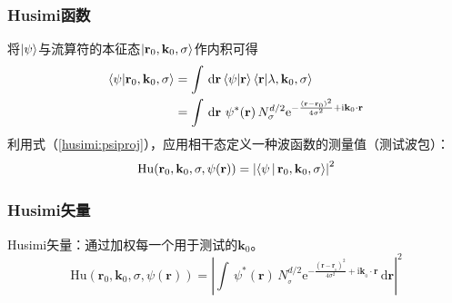 \documentclass[UTF8]{beamer}
\begin{document}
\begin{frame}
    \frametitle{Husimi函数}
    将$\ket{\psi}$与流算符的本征态$\ket{\mathbf{r}_0,\mathbf{k}_0,\sigma}$作内积可得
    \begin{align}
        \braket{\mathbf{\psi}|\mathbf{r}_0,\mathbf{k}_0,\sigma} & = \int \,\mathrm{d}\mathbf{r}\braket{\mathbf{\psi}|\mathbf{r}}\braket{\mathbf{r}|\lambda,\mathbf{k}_0,\sigma}                                                          \\
                                                                & = \int \,\mathrm{d}\mathbf{r}\ \psi^{*}(\mathbf{r})\,N_{\sigma}^{d/2}\mathrm{e}^{-\frac{(\mathbf{r}-\mathbf{r}_0)^2}{4\sigma^2}+\mathrm{i}\mathbf{k}_0\cdot\mathbf{r}}
        \label{husimi:psiproj}
    \end{align}
    利用式（\ref{husimi:psiproj}），应用相干态定义一种波函数的测量值（测试波包）：
    \begin{equation}
        \mathrm{Hu}(\mathbf{r}_0,\mathbf{k}_0, \sigma,\psi(\mathbf{r}))=\left\lvert\Braket{\mathbf{\psi}|\mathbf{r}_0,\mathbf{k}_0,\sigma}\right\rvert^2
        \label{husimi:function}
    \end{equation}
\end{frame}
\begin{frame}
    \frametitle{Husimi矢量}
    Husimi矢量：通过加权每一个用于测试的$\mathbf{k}_0$。
    \begin{equation*}
        \mathrm{Hu}(\mathbf{r}_0,\mathbf{k}_0, \sigma,\psi(\mathbf{r}))= \left\lvert \int \,\psi^{*}(\mathbf{r})\,N_{_\sigma}^{d/2}\mathrm{e}^{-\frac{(\mathbf{r}-\mathbf{r}_{_0})^2}{4\sigma^2}+\mathrm{i}\mathbf{k}_{_0}\cdot\mathbf{r}} \,\mathrm{d}\mathbf{r} \right\rvert^2
    \end{equation*}
    \begin{figure}
        \centering
    \end{figure}
\end{frame}
\end{document}
